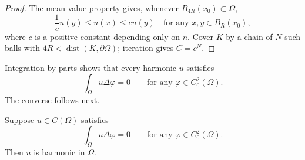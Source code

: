 \begin{proof}
\sketch The mean value property gives, whenever $B_{4R}(x_0)\subset\Omega$,
\[
\frac{1}{c}u(y)\le u(x)\le cu(y)\quad \text{for any } x,y\in B_R(x_0),
\]
where $c$ is a positive constant depending only on $n$.
Cover $K$ by a chain of $N$ such balls with
$4R<\operatorname{dist}(K,\partial\Omega)$; iteration gives $C=c^N$.
\end{proof}

Integration by parts shows that every harmonic $u$ satisfies
\[
\int_{\Omega} u\Delta\varphi = 0 \qquad \text{for any $\varphi\in C_0^2(\Omega)$.}
\]
The converse follows next.

\begin{theorem}\label{hanlin:thm-distributional-harmonic}
Suppose $u\in C(\Omega)$ satisfies
\begin{equation}
\int_{\Omega} u\Delta\varphi = 0 \qquad \text{for any $\varphi\in C_0^2(\Omega)$}.
\tag{1}
\end{equation}
Then $u$ is harmonic in $\Omega$.
\end{theorem}

